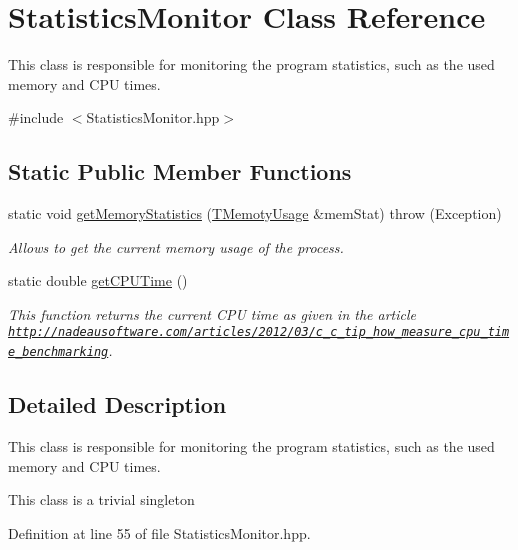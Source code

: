 \hypertarget{class_statistics_monitor}{}\section{Statistics\+Monitor Class Reference}
\label{class_statistics_monitor}


This class is responsible for monitoring the program statistics, such as the used memory and C\+P\+U times.  




{\ttfamily \#include $<$Statistics\+Monitor.\+hpp$>$}

\subsection*{Static Public Member Functions}
\begin{DoxyCompactItemize}
\item 
static void \hyperlink{class_statistics_monitor_a00243d75edfd193a258cbd49af37e021}{get\+Memory\+Statistics} (\hyperlink{struct_t_memoty_usage}{T\+Memoty\+Usage} \&mem\+Stat)  throw (\+Exception)
\begin{DoxyCompactList}\small\item\em Allows to get the current memory usage of the process. \end{DoxyCompactList}\item 
static double \hyperlink{class_statistics_monitor_ac953ddc655f3354a5b63bbdbe9c74179}{get\+C\+P\+U\+Time} ()
\begin{DoxyCompactList}\small\item\em This function returns the current C\+P\+U time as given in the article \href{http://nadeausoftware.com/articles/2012/03/c_c_tip_how_measure_cpu_time_benchmarking}{\tt http\+://nadeausoftware.\+com/articles/2012/03/c\+\_\+c\+\_\+tip\+\_\+how\+\_\+measure\+\_\+cpu\+\_\+time\+\_\+benchmarking}. \end{DoxyCompactList}\end{DoxyCompactItemize}


\subsection{Detailed Description}
This class is responsible for monitoring the program statistics, such as the used memory and C\+P\+U times. 

This class is a trivial singleton 

Definition at line 55 of file Statistics\+Monitor.\+hpp.




